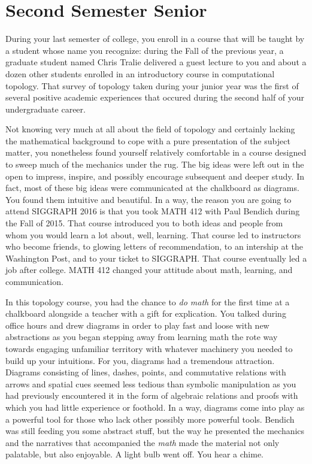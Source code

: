 \documentclass[../main.tex]{subfiles}
\begin{document}
\section{Second Semester Senior}
 
During your last semester of college, you enroll in a course that will be taught by a student whose name you recognize: during the Fall of the previous year, a graduate student named Chris Tralie delivered a guest lecture to you and about a dozen other students enrolled in an introductory course in computational topology. That survey of topology taken during your junior year was the first of several positive academic experiences that occured during the second half of your undergraduate career.

Not knowing very much at all about the field of topology and certainly lacking the mathematical background to cope with a pure presentation of the subject matter, you nonetheless found yourself relatively comfortable in a course designed to sweep much of the mechanics under the rug. The big ideas were left out in the open to impress, inspire, and possibly encourage subsequent and deeper study. In fact, most of these big ideas were communicated at the chalkboard as diagrams. You found them intuitive and beautiful. In a way, the reason you are going to attend SIGGRAPH 2016 is that you took MATH 412 with Paul Bendich during the Fall of 2015. That course introduced you to both ideas and people from whom you would learn a lot about, well, learning. That course led to instructors who become friends, to glowing letters of recommendation, to an intership at the Washington Post, and to your ticket to SIGGRAPH. That course eventually led a job after college. MATH 412 changed your attitude about math, learning, and communication.

In this topology course, you had the chance to \textit{do math} for the first time at a chalkboard alongside a teacher with a gift for explication. You talked during office hours and drew diagrams in order to play fast and loose with new abstractions as you began stepping away from learning math the rote way towards engaging unfamiliar territory with whatever machinery you needed to build up your intuitions. For you, diagrams had a tremendous attraction. Diagrams consisting of lines, dashes, points, and commutative relations with arrows and spatial cues seemed less tedious than symbolic manipulation as you had previously encountered it in the form of algebraic relations and proofs with which you had little experience or foothold. In a way, diagrams come into play as a powerful tool for those who lack other possibly more powerful tools. Bendich was still feeding you some abstract stuff, but the way he presented the mechanics and the narratives that accompanied the \textit{math} made the material not only palatable, but also enjoyable. A light bulb went off. You hear a chime.
\end{document}
